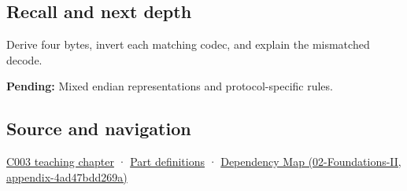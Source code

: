 \subsection{Recall and next depth}\label{appendix-bc07c3d25b18-recall-and-next-depth}

Derive four bytes, invert each matching codec, and explain the mismatched decode.

\textbf{Pending:} Mixed endian representations and protocol-specific rules.

\subsection{Source and navigation}\label{appendix-bc07c3d25b18-source-and-navigation}

\hyperref[01-foundations-i-ch002-where-the-bytes-live]{C003 teaching chapter} · \hyperref[appendix-fd090d982a15-m003---parts-41-60]{Part definitions} · \href{../02-Foundations-II/main.pdf\#nameddest=appendix-4ad47bdd269a}{Dependency Map (02-Foundations-II, appendix-4ad47bdd269a)}
